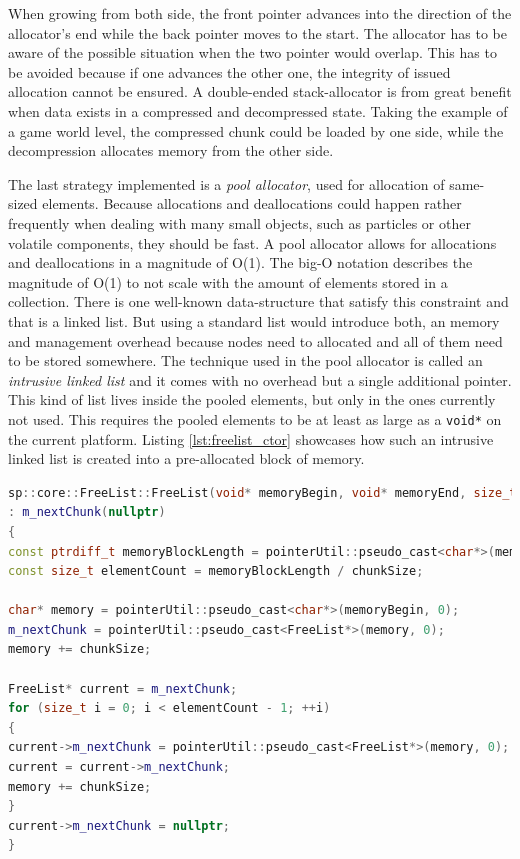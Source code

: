 \noindent
When growing from both side, the front pointer advances into the direction of the allocator's end while the back pointer moves to the start. The allocator has to be aware of the possible situation when the two pointer would overlap. This has to be avoided because if one advances the other one, the integrity of issued allocation cannot be ensured. A double-ended stack-allocator is from great benefit when data exists in a compressed and decompressed state. Taking the example of a game world level, the compressed chunk could be loaded by one side, while the decompression allocates memory from the other side.

The last strategy implemented is a \textit{pool allocator}, used for allocation of same-sized elements. Because allocations and deallocations could happen rather frequently when dealing with many small objects, such as particles or other volatile components, they should be fast. A pool allocator allows for allocations and deallocations in a magnitude of O(1). The big-O notation describes the magnitude of O(1) to not scale with the amount of elements stored in a collection. There is one well-known data-structure that satisfy this constraint and that is a linked list. But using a standard list would introduce both, an memory and management overhead because nodes need to allocated and all of them need to be stored somewhere. The technique used in the pool allocator is called an \textit{intrusive linked list} and it comes with no overhead but a single additional pointer. This kind of list lives inside the pooled elements, but only in the ones currently not used. This requires the pooled elements to be at least as large as a \texttt{void*} on the current platform. Listing \ref{lst:freelist_ctor} showcases how such an intrusive linked list is created into a pre-allocated block of memory.\\

\begin{lstlisting}[caption={Constructor of the FreeList class in the C++ project. It showcases how the list is created in a pre-allocated memory region.}, label={lst:freelist_ctor}, language={C++}]
sp::core::FreeList::FreeList(void* memoryBegin, void* memoryEnd, size_t chunkSize)
: m_nextChunk(nullptr)
{
const ptrdiff_t memoryBlockLength = pointerUtil::pseudo_cast<char*>(memoryEnd, 0) - pointerUtil::pseudo_cast<char*>(memoryBegin, 0);
const size_t elementCount = memoryBlockLength / chunkSize;

char* memory = pointerUtil::pseudo_cast<char*>(memoryBegin, 0);
m_nextChunk = pointerUtil::pseudo_cast<FreeList*>(memory, 0);
memory += chunkSize;

FreeList* current = m_nextChunk;
for (size_t i = 0; i < elementCount - 1; ++i)
{
current->m_nextChunk = pointerUtil::pseudo_cast<FreeList*>(memory, 0);
current = current->m_nextChunk;
memory += chunkSize;
}
current->m_nextChunk = nullptr;
}
\end{lstlisting}

